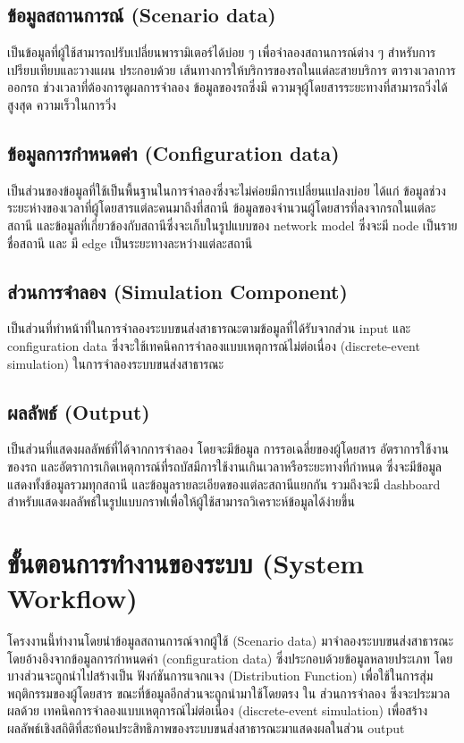 \subsection{ข้อมูลสถานการณ์ (Scenario data)}
\begin{mypara}
  \indent เป็นข้อมูลที่ผู้ใช้สามารถปรับเปลี่ยนพารามิเตอร์ได้บ่อย ๆ เพื่อจำลองสถานการณ์ต่าง ๆ 
  สำหรับการเปรียบเทียบและวางแผน ประกอบด้วย เส้นทางการให้บริการของรถในแต่ละสายบริการ 
  ตารางเวลาการออกรถ ช่วงเวลาที่ต้องการดูผลการจําลอง ข้อมูลของรถซึ่งมี 
  ความจุผู้โดยสารระยะทางที่สามารถวิ่งได้สูงสุด ความเร็วในการวิ่ง
\end{mypara}
\subsection{ข้อมูลการกำหนดค่า (Configuration data)}
\begin{mypara}
  \indent เป็นส่วนของข้อมูลที่ใช้เป็นพื้นฐานในการจำลองซึ่งจะไม่ค่อยมีการเปลี่ยนแปลงบ่อย 
  ได้แก่ ข้อมูลช่วงระยะห่างของเวลาที่ผู้โดยสารแต่ละคนมาถึงที่สถานี ข้อมูลของจำนวนผู้โดยสารที่ลงจากรถในแต่ละสถานี 
  และข้อมูลที่เกี่ยวข้องกับสถานีซึ่งจะเก็บในรูปแบบของ network model ซึ่งจะมี 
  node เป็นรายชื่อสถานี และ มี edge เป็นระยะทางละหว่างแต่ละสถานี
  \end{mypara}
\subsection{ส่วนการจำลอง (Simulation Component)}
\begin{mypara}
  \indent เป็นส่วนที่ทำหน้าที่ในการจำลองระบบขนส่งสาธารณะตามข้อมูลที่ได้รับจากส่วน input 
  และ configuration data ซึ่งจะใช้เทคนิคการจำลองแบบเหตุการณ์ไม่ต่อเนื่อง (discrete-event simulation) 
  ในการจำลองระบบขนส่งสาธารณะ 
\end{mypara}
\subsection{ผลลัพธ์ (Output)}
\begin{mypara}
  \indent เป็นส่วนที่แสดงผลลัพธ์ที่ได้จากการจำลอง โดยจะมีข้อมูล การรอเฉลี่ยของผู้โดยสาร อัตราการใช้งานของรถ 
  และอัตราการเกิดเหตุการณ์ที่รถบัสมีการใช้งานเกินเวลาหรือระยะทางที่กำหนด
  ซึ่งจะมีข้อมูลแสดงทั้งข้อมูลรวมทุกสถานี และข้อมูลรายละเอียดของแต่ละสถานีแยกกัน รวมถึงจะมี dashboard 
  สำหรับแสดงผลลัพธ์ในรูปแบบกราฟเพื่อให้ผู้ใช้สามารถวิเคราะห์ข้อมูลได้ง่ายขึ้น 
\end{mypara}
\section{ขั้นตอนการทำงานของระบบ (System Workflow)}
\begin{mypara}
    \indent โครงงานนี้ทำงานโดยนำข้อมูลสถานการณ์จากผู้ใช้ (Scenario data) มาจำลองระบบขนส่งสาธารณะ 
    โดยอ้างอิงจากข้อมูลการกำหนดค่า (configuration data) ซึ่งประกอบด้วยข้อมูลหลายประเภท 
    โดยบางส่วนจะถูกนำไปสร้างเป็น ฟังก์ชันการแจกแจง (Distribution Function) เพื่อใช้ในการสุ่มพฤติกรรมของผู้โดยสาร 
    ขณะที่ข้อมูลอีกส่วนจะถูกนำมาใช้โดยตรง ใน ส่วนการจำลอง ซึ่งจะประมวลผลด้วย
    เทคนิคการจำลองแบบเหตุการณ์ไม่ต่อเนื่อง (discrete-event simulation) 
    เพื่อสร้างผลลัพธ์เชิงสถิติที่สะท้อนประสิทธิภาพของระบบขนส่งสาธารณะมาแสดงผลในส่วน output
\end{mypara}

